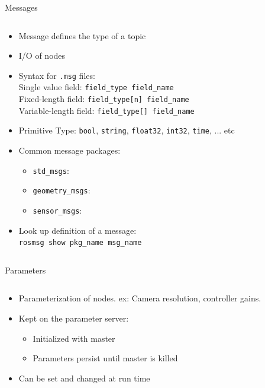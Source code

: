 \documentclass[aspectratio=43]{beamer}
\newcommand{\inline}[1]{\texttt{#1}}
\begin{document}
\begin{frame}{Messages}
	\begin{columns}
		\begin{column}{0.7\textwidth}
			\begin{itemize}
				\item Message defines the type of a topic
				\item I/O of nodes
				\item Syntax for \texttt{.msg} files:\\%
					Single value field: \inline{field_type field_name}\\%
					Fixed-length field: \inline{field_type[n] field_name}\\%
					Variable-length field: \inline{field_type[] field_name}
				\item Primitive Type: \inline{bool}, \inline{string}, \inline{float32}, \inline{int32}, \inline{time}, ... etc
				\item Common message packages:
					\begin{itemize}
						\item \inline{std_msgs}: 
						\item \inline{geometry_msgs}:
						\item \inline{sensor_msgs}:
					\end{itemize}
				\item Look up definition of a message:\\\inline{rosmsg show pkg_name msg_name}
			\end{itemize}
		\end{column}
		\begin{column}{0.3\textwidth}
			\centering
		\end{column}
	\end{columns}
\end{frame}

\begin{frame}{Parameters}
	\todo{refine}
	\begin{columns}
		\begin{column}{1.0\textwidth}
			\begin{itemize}
				\item Parameterization of nodes. ex: Camera resolution, controller gains.
				\item Kept on the parameter server:
					\begin{itemize}
						\item Initialized with master
						\item Parameters persist until master is killed
					\end{itemize}
				\item Can be set and changed at run time
			\end{itemize}
		\end{column}
	\end{columns}
\end{frame}
\end{document}
